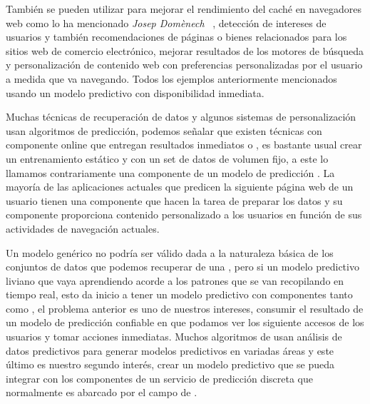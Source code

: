 


También se pueden utilizar para mejorar el rendimiento del caché en navegadores web como lo ha mencionado \emph{Josep Domènech} \etal~\cite{Domenech2006},  detección de intereses de usuarios y también recomendaciones de páginas o bienes relacionados para los sitios {web} de comercio electrónico, mejorar  resultados de los motores de búsqueda y personalización de contenido web con preferencias personalizadas por el usuario a medida que va navegando. Todos los ejemplos anteriormente mencionados usando un modelo predictivo con disponibilidad inmediata.





Muchas técnicas de recuperación de datos y algunos sistemas de personalización usan algoritmos de predicción, podemos señalar que existen técnicas con componente online que entregan resultados inmediatos o \online, es bastante usual crear un entrenamiento estático y con un set de datos de volumen fijo, a este lo llamamos contrariamente una componente \offline de un modelo de predicción . La mayoría de las aplicaciones actuales que predicen la siguiente página web de un usuario tienen una componente  \offline que hacen la tarea de preparar los datos y su componente \online  proporciona contenido personalizado a los usuarios en función de sus actividades de navegación actuales.

Un modelo genérico no podría ser válido dada a la naturaleza básica de los conjuntos de datos que podemos recuperar de una \web, pero si un modelo predictivo liviano que vaya aprendiendo acorde a los patrones que se van recopilando en tiempo real, esto da inicio a tener un modelo predictivo con componentes tanto \online como \offline, el problema anterior es uno de nuestros intereses, consumir el resultado de un modelo de predicción confiable en que podamos ver los siguiente accesos de los usuarios y tomar acciones inmediatas. Muchos algoritmos de \machinelearning usan análisis de datos predictivos para generar modelos predictivos en variadas áreas y este último es nuestro segundo interés, crear un modelo predictivo que se pueda integrar con los componentes de un servicio de predicción discreta que normalmente es abarcado por el campo de \machinelearning.  